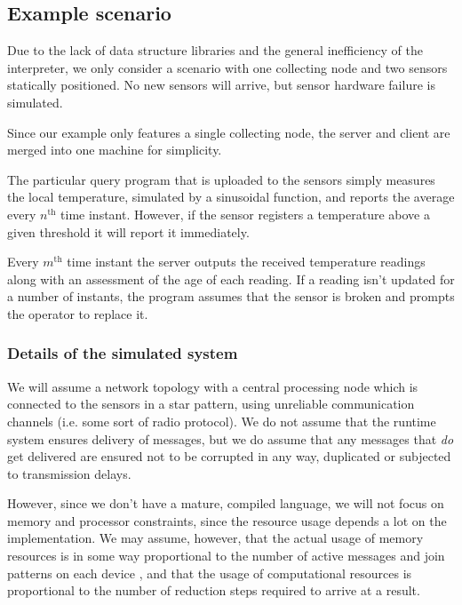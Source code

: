 \subsection*{Example scenario}

Due to the lack of data structure libraries and the general inefficiency of the
interpreter, we only consider a scenario with one collecting node and two
sensors statically positioned. No new sensors will arrive, but sensor hardware
failure is simulated.

Since our example only features a single collecting node, the server and client
are merged into one machine for simplicity.

The particular query program that is uploaded to the sensors simply measures
the local temperature, simulated by a sinusoidal function, and reports the
average every $n^{\text{th}}$ time instant.  However, if the sensor registers a
temperature above a given threshold it will report it immediately.

Every $m^\text{th}$ time instant the server outputs the received temperature
readings along with an assessment of the age of each reading. If a reading
isn't updated for a number of instants, the program assumes that the sensor
is broken and prompts the operator to replace it.

\subsubsection*{Details of the simulated system}

We will assume a network topology with a central processing node which is
connected to the sensors in a star pattern, using unreliable communication
channels (i.e. some sort of radio protocol).  We do not assume that the runtime
system ensures delivery of messages, but we do assume that any messages that
\emph{do} get delivered are ensured not to be corrupted in any way, duplicated
or subjected to transmission delays.

However, since we don't have a mature, compiled language, we will not focus on
memory and processor constraints, since the resource usage depends a lot on the
implementation. We may assume, however, that the actual usage of memory
resources is in some way proportional to the number of active messages and join
patterns on each device , and that the usage of computational resources is
proportional to the number of reduction steps required to arrive at a result.

